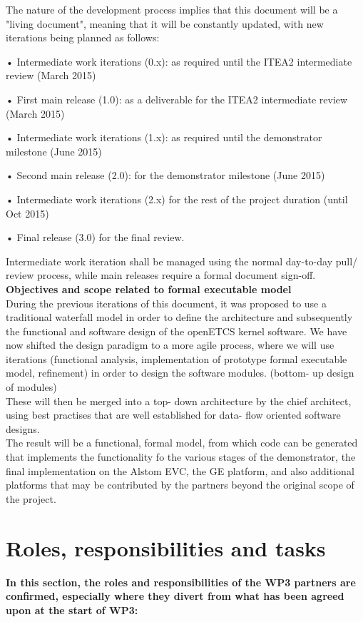 The nature of the development process implies that this document will be a "living document", meaning that it will be constantly updated, with new iterations being planned as follows:

•  Intermediate work iterations (0.x): as required until the ITEA2 intermediate review (March 2015)

• First main release (1.0): as a deliverable for the ITEA2 intermediate review (March 2015)

• Intermediate work iterations (1.x): as required until the demonstrator milestone (June 2015)

•  Second main release (2.0): for the demonstrator milestone (June 2015)

•  Intermediate work iterations (2.x) for the rest of the project duration (until Oct 2015)

•  Final release (3.0) for the final review.

Intermediate work iteration shall be managed using the normal day-to-day pull/ review process, while main releases require a formal document sign-off.\\


\textbf{Objectives and scope related to formal executable model}\\

During the previous iterations of this document, it was proposed to use a traditional waterfall model in order to define the architecture and subsequently the functional and software design of the openETCS kernel software.
We have now shifted the design paradigm to a more agile process, where we will use iterations (functional analysis, implementation of prototype formal executable model, refinement) in order to design the software modules. (bottom- up design of modules)\\
These will then be merged into a top- down architecture by the chief architect, using best practises that are well established for data- flow oriented software designs.\\

The result will be a functional, formal model, from which code can be generated that implements the functionality fo the various stages of the demonstrator, the final implementation on the Alstom EVC, the GE platform, and also additional platforms that may be contributed by the partners beyond the original scope of the project.\\



\section{Roles, responsibilities and tasks}
\textbf{In this section, the roles and responsibilities of the WP3 partners are confirmed, especially where they divert from what has been agreed upon at the start of WP3:}

